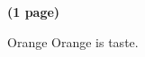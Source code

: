 \documentclass[journal]{IEEEtran}
\begin{document}
\textbf{(1 page)}

\newpage

 

\begin{IEEEbiography}{Orange}
Orange is taste.
\end{IEEEbiography}


\end{document}
